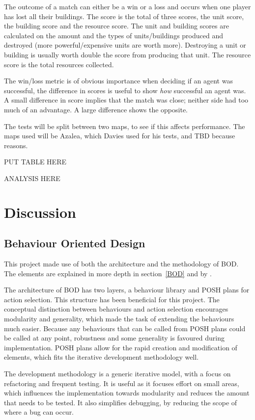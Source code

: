 \documentclass[11pt,openright,a4paper]{report}
\begin{document}
The outcome of a match can either be a win or a loss and occurs when one player has lost all their buildings. The score is the total of three scores, the unit score, the building score and the resource score. The unit and building scores are calculated on the amount and the types of units/buildings produced and destroyed (more powerful/expensive units are worth more). Destroying a unit or building is usually worth double the score from producing that unit. The resource score is the total resources collected.

The win/loss metric is of obvious importance when deciding if an agent was successful, the difference in scores is useful to show \textit{how} successful an agent was. A small difference in score implies that the match was close; neither side had too much of an advantage. A large difference shows the opposite.

The tests will be split between two maps, to see if this affects performance. The maps used will be Azalea, which Davies used for his tests, and TBD because reasons.

PUT TABLE HERE

ANALYSIS HERE


\chapter{Discussion}


\section{Behaviour Oriented Design}
This project made use of both the architecture and the methodology of BOD. The elements are explained in more depth in section~\ref{BOD} and by .

The architecture of BOD has two layers, a behaviour library and POSH plans for action selection. This structure has been beneficial for this project. The conceptual distinction between behaviours and action selection encourages modularity and generality, which made the task of extending the behaviours much easier. Because any behaviours that can be called from POSH plans could be called at any point, robustness and some generality is favoured during implementation.  POSH plans allow for the rapid creation and modification of elements, which fits the iterative development methodology well.

The development methodology is a generic iterative model, with a focus on refactoring and frequent testing. It is useful as it focuses effort on small areas, which influences the implementation towards modularity and reduces the amount that needs to be tested. It also simplifies debugging, by reducing the scope of where a bug can occur.
\end{document}
